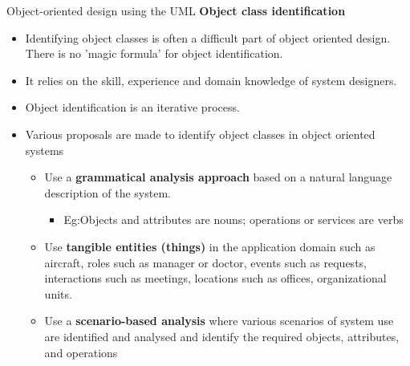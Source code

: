 \documentclass{beamer}
\begin{document}
\begin{frame}{Object-oriented design using the UML}
	\textbf{Object class identification}
	\begin{itemize}
	\item Identifying object classes is often a difficult part of object oriented design. There is no 'magic formula' for object identification.
\item  It relies on the skill, experience and domain knowledge of system designers.
	\item  Object identification is an iterative process. 
\item Various proposals are made to identify object 
classes in object oriented systems

	\begin{itemize}
		\item Use a \textbf{grammatical analysis approach} based on a natural language description of the 
		system. \begin{itemize}
			\item Eg:Objects and attributes are nouns; operations or services are verbs
		\end{itemize}
		\item Use \textbf{tangible entities (things)} in the application domain such as aircraft, roles such as 
		manager or doctor, events such as requests, interactions such as meetings, locations such 
		as offices, organizational units.
		\item Use a \textbf{scenario-based analysis} where various scenarios of system use are identified and 
		analysed and identify the required objects, attributes, and operations
	\end{itemize}
\end{itemize}
\end{frame}
\end{document}
